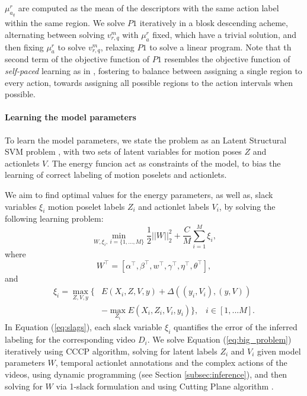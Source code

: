 $\mu_{a_q}^r$ are computed as the mean of the descriptors with the same action 
label within the same region. We solve $P1$ iteratively in a blosk descending acheme, alternating between solving $v_{r,q}^m$ with $\mu_{a}^r$ fixed, which have a trivial solution, and then fixing $\mu_{a}^r$ to solve $v_{r,q}^m$, relaxing $P1$ to solve a linear program. Note that th second term of the objective function of $P1$ resembles the objective 
function of \emph{self-paced} learning as in \cite{Kumar:EtAl:2010}, fostering to 
balance between assigning a single region to every action, towards assigning 
all 
possible regions to the action intervals when possible.  

\paragraph{Learning the model parameters}
To learn the model parameters, we state the problem as an Latent Structural SVM problem \cite{Yu:Joachims:2010}, with two sets of latent variables for motion poses $Z$ and actionlets $V$. The energy funcion act as constraints of the model, to bias the learning of correct labeling of motion poselets and actionlets. 

We aim to find
optimal values for the energy parameters, as well as,
slack variables $\xi_i$ motion poselet labels $Z_i$ and actionlet labels $V_i$, by solving the following learning problem:
\begin{equation}
\label{eq:big_problem}
\min_{W,\xi_i,~i=\{1,\dots,M\}}    \frac{1}{2}||W||_2^2 + \frac{C}{M} \sum_{i=1}^M\xi_i ,
\end{equation}
where
\begin{equation}
W^\top=[\alpha^\top, \beta^\top, w^\top, \gamma^\top, \eta^\top, \theta^\top],
\end{equation}
and
\begin{equation} \label{eq:slags}
\begin{split}
\xi_i = \max_{Z,V,y}  \{  & E(X_i, Z, V, y) + \Delta( (y_i,V_i), (y, V)) \\
 & - \max_{Z_i}{ E(X_i, Z_i, V_i, y_i)} \}, \; \;\; i\in[1,...M].	
\end{split}
\end{equation}
In Equation (\ref{eq:slags}), each slack variable
$\xi_i$ quantifies the error of the inferred labeling for the corresponding video $D_i$. We solve Equation (\ref{eq:big_problem}) iteratively using CCCP algorithm, solving for latent labels $Z_i$ and $V_i$ given model parameters $W$, temporal actionlet annotations and the complex actions of the videos, using dynamic programming (see Section \ref{subsec:inference}), and then solving for $W$ via 1-slack formulation and using Cutting Plane algorithm \cite{Joachims2009}. 

